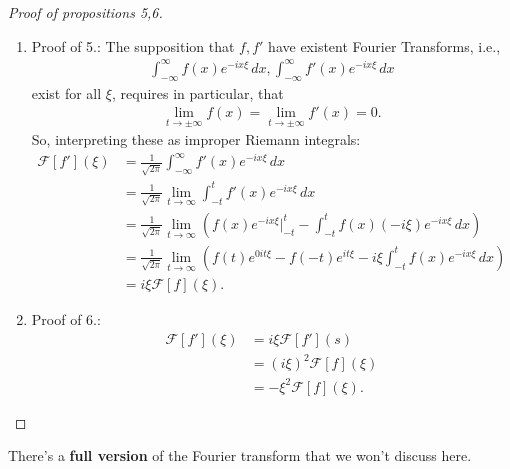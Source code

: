 \documentclass{book}
\theoremstyle{definition}
\newcommand{\F}{\mathcal{F}}
\begin{document}
\begin{proof}[Proof of propositions 5,6]
	\begin{enumerate}
		\item Proof of 5.: The supposition that $f,f'$ have existent Fourier Transforms, i.e.,
	\begin{align*}
	\int^\infty_{-\infty}f(x)e^{-ix\xi}\,dx, \int^\infty_{-\infty}f'(x)e^{-ix\xi}\,dx
	\end{align*}
	exist for all $\xi$, requires in particular, that
	\begin{align*}
	\lim_{t\to\pm\infty} f(x) = \lim_{t\to\pm\infty} f'(x) = 0.
	\end{align*}
	So, interpreting these as improper Riemann integrals:
	\begin{align*}
	\F[f'](\xi) &= \frac{1}{\sqrt{2\pi}}\int^\infty_{-\infty}f'(x)e^{-ix\xi}\,dx\\
	&= \frac{1}{\sqrt{2\pi}}\lim_{t\to\infty}\int^t_{-t}f'(x)e^{-ix\xi}\,dx\\
	&= \frac{1}{\sqrt{2\pi}}\lim_{t\to\infty}\left( f(x)e^{-ix\xi}\bigg\vert_{-t}^t - \int^t_{-t}f(x)(-i\xi)e^{-ix\xi}\,dx  \right)\\
	&= \frac{1}{\sqrt{2\pi}}\lim_{t\to\infty}\left( f(t)e^{0it\xi} - f(-t)e^{it\xi} -i\xi\int^t_{-t}f(x)e^{-ix\xi}\,dx \right)\\
	&= i\xi \F[f](\xi).
	\end{align*}
	
	\item Proof of 6.: 
	\begin{align*}
	\F[f'](\xi) &= i\xi\F[f'](s)\\
	&= (i\xi)^2\F[f](\xi)\\
	&= -\xi^2 \F[f](\xi).
	\end{align*}
	
	\end{enumerate}
\end{proof}


There's a \textbf{full version} of the Fourier transform that we won't discuss here.\\
\end{document}

